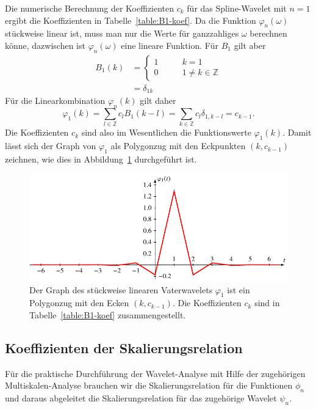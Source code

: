 \begin{beispiel}
Die numerische Berechnung der Koeffizienten $c_k$ für das Spline-Wavelet 
mit $n=1$ ergibt die Koeffizienten in Tabelle~\ref{table:B1-koef}.
Da die Funktion $\varphi_n(\omega)$ stückweise linear ist, muss man nur die
Werte für ganzzahliges $\omega$ berechnen könne, dazwischen ist
$\varphi_n(\omega)$ eine lineare Funktion.
Für $B_1$ gilt aber
\begin{align*}
B_1(k)
&=
\begin{cases}
1&\qquad k=1\\
0&\qquad 1\ne k\in\mathbb Z
\end{cases}
\\
&=\delta_{1k}
\end{align*}
Für die Linearkombination $\varphi_n(k)$ gilt daher
\[
\varphi_1(k)
=
\sum_{l\in\mathbb Z} c_l B_1(k-l)
=
\sum_{k\in\mathbb Z} c_l \delta_{1,k-l}
=
c_{k-1}.
\]
Die Koeffizienten $c_k$ sind also im Wesentlichen die Funktionswerte
$\varphi_1(k)$.
Damit lässt sich der Graph von $\varphi_1$ als Polygonzug mit den Eckpunkten
$(k,c_{k-1})$ zeichnen, wie dies in Abbildung~\ref{phi1:polygonzug}
durchgeführt ist.
\begin{figure}
\centering
\includegraphics{chapters/9-spline/images/Bphi1.pdf}
\caption{Der Graph des stückweise linearen Vaterwavelets $\varphi_1$
ist ein Polygonzug mit den Ecken $(k,c_{k-1})$.
Die Koeffizienten $c_k$ sind in Tabelle~\ref{table:B1-koef} 
zusammengestellt.
\label{phi1:polygonzug}}
\end{figure}
\end{beispiel}

\subsection{Koeffizienten der Skalierungsrelation
\label{subsection:spline-skalierungskoeffizienten}}
Für die praktische Durchführung der Wavelet-Analyse mit Hilfe der
zugehörigen Multiskalen-Analyse brauchen wir die Skalierungsrelation 
für die Funktionen $\phi_n$ und daraus abgeleitet die
Skalierungsrelation für das zugehörige Wavelet $\psi_n$.

